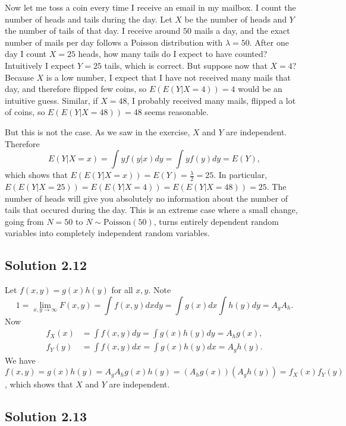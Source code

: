 Now let me toss a coin every time I receive an email in my mailbox.
I count the number of heads and tails during the day.
Let $X$ be the number of heads and $Y$ the number of tails of that day.
I receive around $50$ mails a day, and the exact number of mails per day follows a Poisson distribution with $\lambda = 50$.
After one day I count $X = 25$ heads, how many tails do I expect to have counted?
Intuitively I expect $Y = 25$ tails, which is correct.
But suppose now that $X = 4$?
Because $X$ is a low number, I expect that I have not received many mails that day, and therefore flipped few coins, so $E(E(Y | X = 4)) = 4$ would be an intuitive guess.
Similar, if $X = 48$, I probably received many mails, flipped a lot of coins, so $E(E(Y | X = 48)) = 48$ seems reasonable.

But this is not the case.
As we saw in the exercise, $X$ and $Y$ are independent.
Therefore
$$
E(Y | X = x) = \int y f(y|x) dy = \int y f(y) dy = E(Y),
$$
which shows that $E(E(Y | X = x)) = E(Y) = \frac{\lambda}{2} = 25$.
In particular, $E(E(Y | X = 25)) = E(E(Y | X = 4)) = E(E(Y | X = 48)) = 25$.
The number of heads will give you absolutely no information about the number of tails that occured during the day.
This is an extreme case where a small change, going from $N = 50$ to $N \sim \mathrm{Poisson}(50)$, turns entirely dependent random variables into completely independent random variables.


\subsection*{Solution 2.12}

Let $f(x, y) = g(x) h(y)$ for all $x, y$.
Note
$$
1 = \lim_{x, y \to \infty} F(x, y) = \int f(x, y) dx dy = \int g(x) dx \int h(y) dy = A_g A_h.
$$
Now
\begin{equation*}
    \begin{split}
        f_X(x) &= \int f(x, y) dy = \int g(x) h(y) dy = A_h g(x), \\
        f_Y(y) &= \int f(x, y) dx = \int g(x) h(y) dx = A_g h(y).
    \end{split}
\end{equation*}
We have $f(x, y) = g(x) h(y) = A_g A_h g(x) h(y) = (A_h g(x))(A_g h(y)) = f_X(x) f_Y(y)$, which shows that $X$ and $Y$ are independent.


\subsection*{Solution 2.13}

